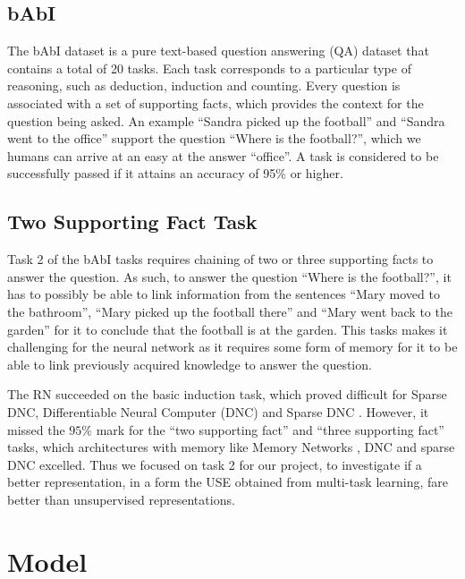 \documentclass{article}
\begin{document}
\subsection{bAbI}
The bAbI dataset is a pure text-based question answering (QA) dataset that contains a total of 20 tasks. Each task corresponds to a particular type of reasoning, such as deduction, induction and counting. Every question is associated with a set of supporting facts, which provides the context for the question being asked. An example ``Sandra picked up the football'' and ``Sandra went to the office'' support the question ``Where is the football?'', which we humans can arrive at an easy at the answer ``office''. A task is considered to be successfully passed if it attains an accuracy of 95\% or higher.


\subsection{Two Supporting Fact Task}
Task 2 of the bAbI tasks requires chaining of two or three supporting facts to answer the question. As such, to answer the question ``Where is the football?'', it has to possibly be able to link information from the sentences ``Mary moved to the bathroom'', ``Mary picked up the football there'' and ``Mary went back to the garden'' for it to conclude that the football is at the garden. This tasks makes it challenging for the neural network as it requires some form of memory for it to be able to link previously acquired knowledge to answer the question. 

The RN succeeded on the basic induction task, which proved difficult for Sparse DNC, Differentiable Neural Computer (DNC) \cite{Graves2016} and Sparse DNC \cite{Rae2016}. However, it missed the $95\%$ mark for the ``two supporting fact'' and ``three supporting fact'' tasks, which architectures with memory like Memory Networks \cite{Weston2015a}, DNC and sparse DNC excelled. Thus we focused on task 2 for our project, to investigate if a better representation, in a form the USE obtained from multi-task learning, fare better than unsupervised representations.




\section{Model}
%
\end{document}
